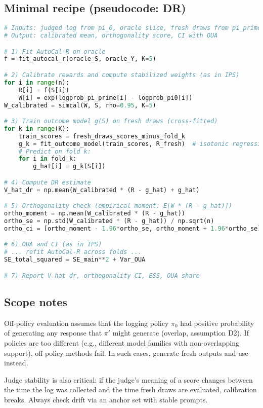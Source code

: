 \subsection{Minimal recipe (pseudocode: DR)}

\begin{lstlisting}[language=Python,caption=Calibrated DR Recipe]
# Inputs: judged log from pi_0, oracle slice, fresh draws from pi_prime
# Output: calibrated mean, orthogonality score, CI with OUA

# 1) Fit AutoCal-R on oracle
f = fit_autocal_r(oracle_S, oracle_Y, K=5)

# 2) Calibrate rewards and compute stabilized weights (as in IPS)
for i in range(n):
    R[i] = f(S[i])
    W[i] = exp(logprob_pi_prime[i] - logprob_pi0[i])
W_calibrated = simcal(W, S, rho=0.95, K=5)

# 3) Train outcome model g(S) on fresh draws (cross-fitted)
for k in range(K):
    train_scores = fresh_draws_scores_minus_fold_k
    g_k = fit_outcome_model(train_scores, R_fresh)  # isotonic regression
    # Predict on fold k:
    for i in fold_k:
        g_hat[i] = g_k(S[i])

# 4) Compute DR estimate
V_hat_dr = np.mean(W_calibrated * (R - g_hat) + g_hat)

# 5) Orthogonality check (empirical moment: E[W * (R - g_hat)])
ortho_moment = np.mean(W_calibrated * (R - g_hat))
ortho_se = np.std(W_calibrated * (R - g_hat)) / np.sqrt(n)
ortho_ci = [ortho_moment - 1.96*ortho_se, ortho_moment + 1.96*ortho_se]

# 6) OUA and CI (as in IPS)
# ... refit AutoCal-R across folds ...
SE_total_squared = SE_main**2 + Var_OUA

# 7) Report V_hat_dr, orthogonality CI, ESS, OUA share
\end{lstlisting}

\subsection{Scope notes}

Off-policy evaluation assumes that the logging policy $\pi_0$ had positive probability of generating any response that $\pi'$ might generate (overlap, assumption D2). If policies are too different (e.g., different model families with non-overlapping support), off-policy methods fail. In such cases, generate fresh outputs and use \dm{} instead.

Judge stability is also critical: if the judge's meaning of a score changes between the time the log was collected and the time fresh draws are evaluated, calibration breaks. Always check drift via an anchor set with stable prompts.
